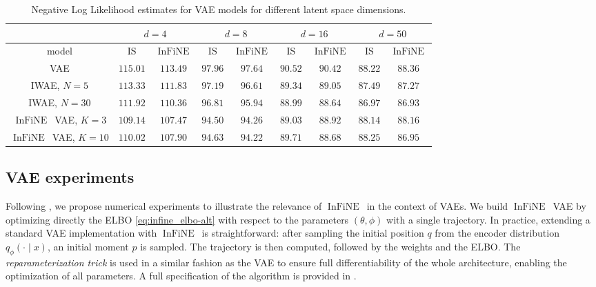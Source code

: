 \documentclass{article}
\def\IFIS{\ensuremath{\operatorname{InFiNE}}}
\def\InFiNE{{\small \IFIS}}
\newcommand{\1}{\mathds{1}}
\begin{document}
\begin{table}[!t]
\centering
\caption{Negative Log Likelihood estimates for VAE models for different latent space dimensions.}
\label{tab:vae_results2}
\begin{tabular}{c|c|c||c|c||c|c||c|c|}
\cline{2-9}
 & \multicolumn{2}{c||}{$d = 4$} & \multicolumn{2}{c||}{$d = 8$} & \multicolumn{2}{c||}{$d = 16$} & \multicolumn{2}{c|}{$d = 50$} \\ \hline
\multicolumn{1}{|c|}{model} & IS & \InFiNE  & IS & \InFiNE& IS  & \InFiNE & IS & \InFiNE \\ \hline
\multicolumn{1}{|c|}{VAE} & $115.01$&$113.49$&$97.96$&$97.64$&$90.52$&$90.42$&$88.22$&$88.36$\\ %
\multicolumn{1}{|c|}{IWAE, $N=5$} & $113.33$&$111.83$&$97.19$&$96.61$&$89.34$&$89.05$&$87.49$&$87.27$ \\ %
\multicolumn{1}{|c|}{IWAE, $N=30$} & $111.92$&$110.36$&$96.81$&$95.94$&$88.99$&$88.64$&$86.97$&$86.93$ \\ \hline
\multicolumn{1}{|c|}{\InFiNE\ VAE, $K=3$} & $109.14$&$107.47$&$94.50$&$94.26$&$89.03$&$88.92$&$88.14$&$88.16$ \\ %
\multicolumn{1}{|c|}{\InFiNE\ VAE, $K=10$} & $110.02$&$107.90$&$94.63$&$94.22$&$89.71$&$88.68$&$88.25$&$86.95$ \\ \hline
\end{tabular}
\end{table}

\subsection{VAE experiments}
\label{subsec:vae_experiments}
 Following , we propose numerical experiments to illustrate the relevance of  \IFIS\ in the context of VAEs. We build \IFIS\ VAE by optimizing directly the ELBO \eqref{eq:infine_elbo-alt} with respect to the parameters $(\theta, \phi)$ with a single trajectory. In practice, extending a standard VAE implementation with \IFIS\ is straightforward: after sampling the initial position $q$ from the encoder distribution $q_\phi(\cdot\mid x)$, an initial moment $p$ is sampled. The trajectory is then computed, followed by the weights and the ELBO.
The \textit{reparameterization trick} \cite{kingma:welling:2013} is used in a similar fashion as the VAE to ensure full differentiability of the whole architecture, enabling the optimization of all parameters. A full specification of the algorithm is provided in .
\end{document}
